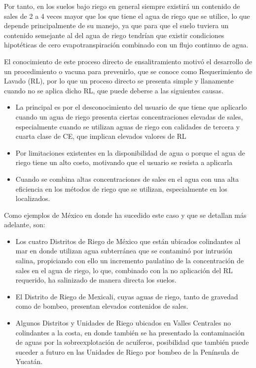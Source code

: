 Por tanto, en los suelos bajo riego en general siempre existirá un contenido de sales de 2 a 4 veces mayor que los que tiene el agua de riego que se utilice, lo que depende principalmente de su manejo, ya que para que el suelo tuviera un contenido semejante al del agua de riego tendrían que existir condiciones hipotéticas de cero evapotranspiración combinado con un flujo continuo de agua.

El conocimiento de este proceso directo de ensalitramiento motivó el desarrollo de
un procedimiento o vacuna para prevenirlo, que se conoce como Requerimiento de
Lavado (RL), por lo que un proceso directo se
presenta simple y llanamente cuando no se aplica dicho RL, que puede deberse a
las siguientes causas.
\begin{itemize}
  \item La principal es por el desconocimiento del usuario de que tiene que aplicarlo cuando un agua de riego presenta ciertas concentraciones elevadas de sales, especialmente cuando se utilizan aguas de riego con calidades de tercera y cuarta clase de CE, que implican elevados valores de RL
  \item Por limitaciones existentes en la disponibilidad de agua o porque el agua de riego tiene un alto costo, motivando que el usuario se resista a aplicarla
  \item Cuando se combina altas concentraciones de sales en el agua con una alta eficiencia en los métodos de riego que se utilizan, especialmente en los localizados.
\end{itemize}
Como ejemplos de México en donde ha sucedido este caso y que se detallan más
adelante, son:
\begin{itemize}
  \item Los cuatro Distritos de Riego de México que están ubicados colindantes al mar en donde utilizan agua subterránea que se contaminó por intrusión salina, propiciando con ello un incremento paulatino de la concentración de sales en el agua de riego, lo que, combinado con la no aplicación del RL requerido, ha salinizado de manera directa los suelos.
  \item El Distrito de Riego de Mexicali, cuyas aguas de riego, tanto de gravedad como de bombeo, presentan elevados contenidos de sales.
  \item Algunos Distritos y Unidades de Riego ubicados en Valles Centrales no colindantes a la costa, en donde también se ha presentado la contaminación de aguas por la sobreexplotación de acuíferos, posibilidad que también puede suceder a futuro en las Unidades de Riego por bombeo de la Península de Yucatán.
\end{itemize}
